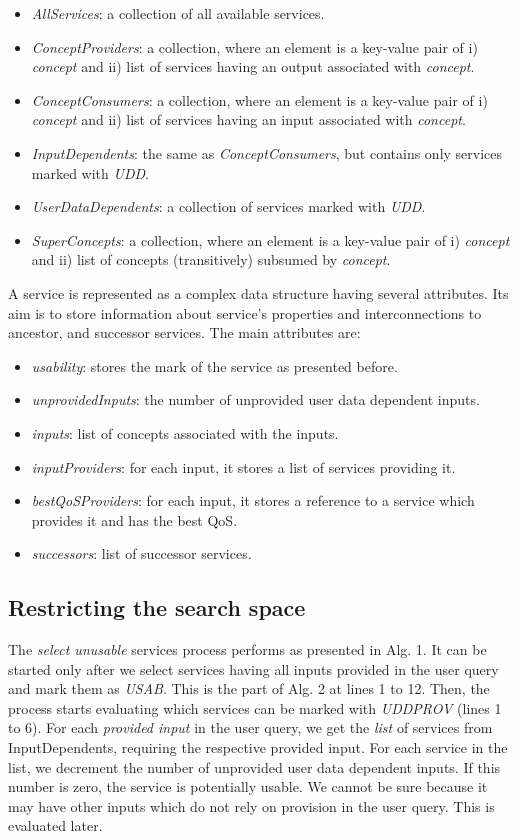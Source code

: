 \documentclass[11pt]{llncs}
\begin{document}
\begin{itemize}
\item \emph{AllServices}: a collection of all available services.
\item \emph{ConceptProviders}: a collection, where an element is a key-value pair of i) \emph{concept} and ii) list of services having an output associated with \emph{concept}.
\item \emph{ConceptConsumers}: a collection, where an element is a key-value pair of i) \emph{concept} and ii) list of services having an input associated with \emph{concept}.
\item \emph{InputDependents}: the same as \emph{ConceptConsumers}, but contains only services marked with \emph{UDD}.
\item \emph{UserDataDependents}: a collection of services marked with \emph{UDD}.
\item \emph{SuperConcepts}: a collection, where an element is a key-value pair of i) \emph{concept}
and ii) list of concepts (transitively) subsumed by \emph{concept}.
\end{itemize}

A service is represented as a complex data structure having several attributes.
Its aim is to store information about service’s properties and interconnections to
ancestor, and successor services. The main attributes are:

\begin{itemize}
\item \emph{usability}: stores the mark of the service as presented before.
\item \emph{unprovidedInputs}: the number of unprovided user data dependent inputs.
\item \emph{inputs}: list of concepts associated with the inputs.
\item \emph{inputProviders}: for each input, it stores a list of services providing it.
\item \emph{bestQoSProviders}: for each input, it stores a reference to a service which provides it and has the best QoS.
\item \emph{successors}: list of successor services.
\end{itemize}

\subsection{Restricting the search space}

The \emph{select unusable} services process performs as presented in Alg. 1. It can be
started only after we select services having all inputs provided in the user query and
mark them as \emph{USAB}. This is the part of Alg. 2 at lines 1 to 12. Then, the process starts
evaluating which services can be marked with \emph{UDDPROV} (lines 1 to 6). For each
\emph{provided input} in the user query, we get the \emph{list} of services from InputDependents,
requiring the respective provided input. For each service in the list, we decrement
the number of unprovided user data dependent inputs. If this number is zero, the
service is potentially usable. We cannot be sure because it may have other inputs
which do not rely on provision in the user query. This is evaluated later.
\end{document}
